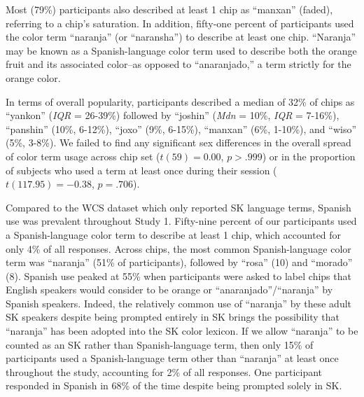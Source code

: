 \documentclass[
  english,
  ,apa7,floatsintext]{apa6}
\begin{document}
Most (79\%) participants also described at least 1 chip as ``manxan'' (faded), referring to a chip's saturation. In addition, fifty-one percent of participants used the color term ``naranja'' (or ``naransha'') to describe at least one chip. ``Naranja'' may be known as a Spanish-language color term used to describe both the orange fruit and its associated color--as opposed to ``anaranjado,'' a term strictly for the orange color.

In terms of overall popularity, participants described a median of 32\% of chips as ``yankon'' (\emph{IQR} = 26-39\%) followed by ``joshin'' (\emph{Mdn} = 10\%, \emph{IQR} = 7-16\%), ``panshin'' (10\%, 6-12\%), ``joxo'' (9\%, 6-15\%), ``manxan'' (6\%, 1-10\%), and ``wiso'' (5\%, 3-8\%). We failed to find any significant sex differences in the overall spread of color term usage across chip set (\(t(59) = 0.00\), \(p > .999\)) or in the proportion of subjects who used a term at least once during their session (\(t(117.95) = -0.38\), \(p = .706\)).

Compared to the WCS dataset which only reported SK language terms, Spanish use was prevalent throughout Study 1. Fifty-nine percent of our participants used a Spanish-language color term to describe at least 1 chip, which accounted for only 4\% of all responses. Across chips, the most common Spanish-language color term was ``naranja'' (51\% of participants), followed by ``rosa'' (10) and ``morado'' (8). Spanish use peaked at 55\% when participants were asked to label chips that English speakers would consider to be orange or ``anaranjado''/``naranja'' by Spanish speakers. Indeed, the relatively common use of ``naranja'' by these adult SK speakers despite being prompted entirely in SK brings the possibility that ``naranja'' has been adopted into the SK color lexicon. If we allow ``naranja'' to be counted as an SK rather than Spanish-language term, then only 15\% of participants used a Spanish-language term other than ``naranja'' at least once throughout the study, accounting for 2\% of all responses. One participant responded in Spanish in 68\% of the time despite being prompted solely in SK.
\end{document}
